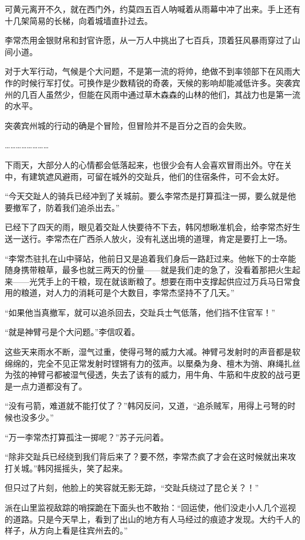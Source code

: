 可黄元离开不久，就在西门外，约莫四五百人呐喊着从雨幕中冲了出来。手上还有十几架简易的长梯，向着城墙直扑过去。

李常杰用金银财帛和封官许愿，从一万人中挑出了七百兵，顶着狂风暴雨穿过了山间小道。

对于大军行动，气候是个大问题，不是第一流的将帅，绝做不到率领部下在风雨大作的时候行军打仗。可换作是少数精锐的奇袭，天候的影响却能减低许多。突袭宾州的几百人虽然少，但能在风雨中通过草木森森的山林的他们，其战力也是第一流的水平。

突袭宾州城的行动的确是个冒险，但冒险并不是百分之百的会失败。

……………………

下雨天，大部分人的心情都会低落起来，也很少会有人会喜欢冒雨出外。守在关中，有建筑遮风避雨，可留在城外的交趾兵，他们的住宿条件，可不会太好。

“今天交趾人的骑兵已经冲到了关城前。要么李常杰是打算孤注一掷，要么就是他要撤军了，防着我们追杀出去。”

已经下了四天的雨，眼见着交趾人快要待不下去，韩冈想瞅准机会，给李常杰好生送一送行。李常杰在广西杀人放火，没有礼送出境的道理，肯定是要打上一场。

“李常杰驻扎在山中驿站，他前日又是追着我们身后一路赶过来。他帐下的士卒能随身携带粮草，最多也就三两天的份量——就是我们走的急了，没看着那把火生起来——光凭手上的干粮，现在就该断粮了。想要在雨中支撑起供应过万兵马日常食用的粮道，对人力的消耗可是个大数目，李常杰坚持不了几天。”

“如果他当真撤军，就可以追杀回去，交趾兵士气低落，他们挡不住官军！”

“就是神臂弓是个大问题。”李信叹着。

这些天来雨水不断，湿气过重，使得弓弩的威力大减。神臂弓发射时的声音都是软绵绵的，完全不见正常发射时铿锵有力的弦声。以檿桑为身、檀木为弰、麻绳扎丝为弦的神臂弓都被湿气侵透，失去了该有的威力，用牛角、牛筋和牛皮胶的战弓更是一点力道都没有了。

“没有弓箭，难道就不能打仗了？”韩冈反问，又道，“追杀贼军，用得上弓弩的时候也没多少。”

“万一李常杰打算孤注一掷呢？”苏子元问着。

“除非交趾兵已经绕到我们背后来了？要不然，李常杰疯了才会在这时候就出来攻打关城。”韩冈摇摇头，笑了起来。

但只过了片刻，他脸上的笑容就无影无踪，“交趾兵绕过了昆仑关？！”

派在山里监视敌踪的哨探跪在下面头也不敢抬：“回运使，他们没走小人几个巡视的道路。只是今天早上，看到了出山的地方有人马经过的痕迹才发现。大约千人的样子，从方向上看是往宾州去的。”

